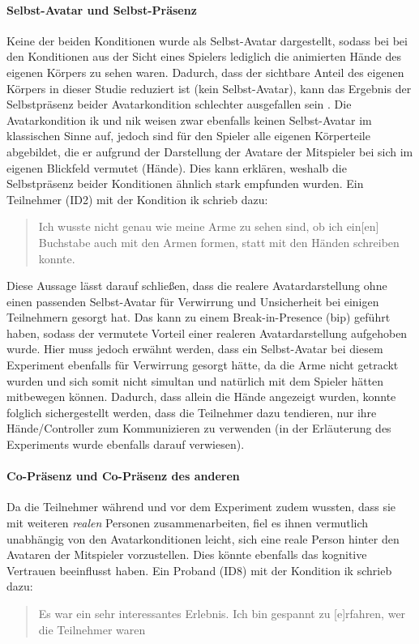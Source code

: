 \documentclass[a4paper,11pt]{article}%
\renewcommand{\\}{\vspace*{0.5\baselineskip} \newline}
\begin{document}
\paragraph{Selbst-Avatar und Selbst-Präsenz}
Keine der beiden Konditionen wurde als Selbst-Avatar dargestellt, sodass bei bei den Konditionen aus der Sicht eines Spielers lediglich die animierten Hände des eigenen Körpers zu sehen waren. 
Dadurch, dass der sichtbare Anteil des eigenen Körpers in dieser Studie reduziert ist (kein Selbst-Avatar), kann das Ergebnis der Selbstpräsenz beider Avatarkondition schlechter ausgefallen sein \citep[421-427]{construal2014connected}.
Die Avatarkondition \ac{ik} und \ac{nik} weisen zwar ebenfalls keinen Selbst-Avatar im klassischen Sinne auf, jedoch sind für den Spieler alle eigenen Körperteile abgebildet, die er aufgrund der Darstellung der Avatare der Mitspieler bei sich im eigenen Blickfeld vermutet (Hände). Dies kann erklären, weshalb die Selbstpräsenz beider Konditionen ähnlich stark empfunden wurden. Ein Teilnehmer (ID2) mit der Kondition \ac{ik} schrieb dazu:
\begin{quote}
\glqq{}Ich wusste nicht genau wie meine Arme zu sehen sind, ob ich ein[en] Buchstabe auch mit den Armen formen, statt mit den Händen schreiben konnte.\dq{}
\end{quote}
Diese Aussage lässt darauf schließen, dass die realere Avatardarstellung ohne einen passenden Selbst-Avatar für Verwirrung und Unsicherheit bei einigen Teilnehmern gesorgt hat. Das kann zu einem Break-in-Presence (\ac{bip}) geführt haben, sodass der vermutete Vorteil einer realeren Avatardarstellung aufgehoben wurde. Hier muss jedoch erwähnt werden, dass ein Selbst-Avatar bei diesem Experiment ebenfalls für Verwirrung gesorgt hätte, da die Arme nicht getrackt wurden und sich somit nicht simultan und natürlich mit dem Spieler hätten mitbewegen können. Dadurch, dass allein die Hände angezeigt wurden, konnte folglich sichergestellt werden, dass die Teilnehmer dazu tendieren, nur ihre Hände/Controller zum Kommunizieren zu verwenden (in der Erläuterung des Experiments wurde ebenfalls darauf verwiesen).

\paragraph{Co-Präsenz und Co-Präsenz des anderen} Da die Teilnehmer während und vor dem Experiment zudem wussten, dass sie mit weiteren \textit{realen} Personen zusammenarbeiten, fiel es ihnen vermutlich unabhängig von den Avatarkonditionen leicht, sich eine reale Person hinter den Avataren der Mitspieler vorzustellen. Dies könnte ebenfalls das kognitive Vertrauen beeinflusst haben. Ein Proband (ID8) mit der Kondition \ac{ik} schrieb dazu:
\begin{quote}
\glqq{}Es war ein sehr interessantes Erlebnis. Ich bin gespannt zu [e]rfahren, wer die Teilnehmer waren\dq{}
\end{quote}
\end{document}
